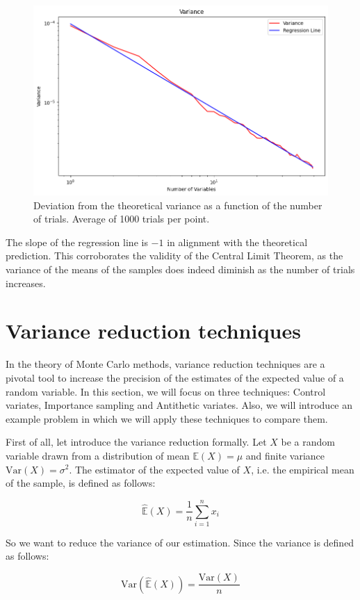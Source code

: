 \documentclass{report}
\begin{document}
\begin{figure}[H]
	\centering
	\includegraphics[width=0.5\linewidth]{./Figures/CLT/varianceslope.png}
	\caption{Deviation from the theoretical variance as a function of the number of trials. Average of 1000 trials per point.}
	\label{fig:variancereg}
\end{figure}

The slope of the regression line is \(-1\) in alignment with the theoretical prediction. This corroborates the validity of the Central Limit Theorem, as the variance of the means of the samples does indeed diminish as the number of trials increases.

\section{Variance reduction techniques}
\label{sec:variance_reduction}

In the theory of Monte Carlo methods, variance reduction techniques are a pivotal tool to increase the precision of the estimates of the expected value of a random variable. In this section, we will focus on three techniques: Control variates, Importance sampling and Antithetic variates. Also, we will introduce an example problem in which we will apply these techniques to compare them.

First of all, let introduce the variance reduction formally. Let $X$ be a random variable drawn from a distribution of mean \(\mathbb{E}(X) = \mu\) and finite variance \(\mathrm{Var}(X) = \sigma^2\). The estimator of the expected value of \(X\), i.e. the empirical mean of the sample, is defined as follows:

\begin{equation} 
	\label{eq:expectedvalueestimate} 
	\hat{\mathbb{E}}(X) = \frac{1}{n} \sum_{i=1}^{n} x_i
\end{equation}

So we want to reduce the variance of our estimation. Since the variance is defined as follows:

\begin{equation} 
	\label{eq:variance} 
	\mathrm{Var}(\hat{\mathbb{E}}(X)) = \frac{\mathrm{Var}(X)}{n}
\end{equation}
\end{document}
